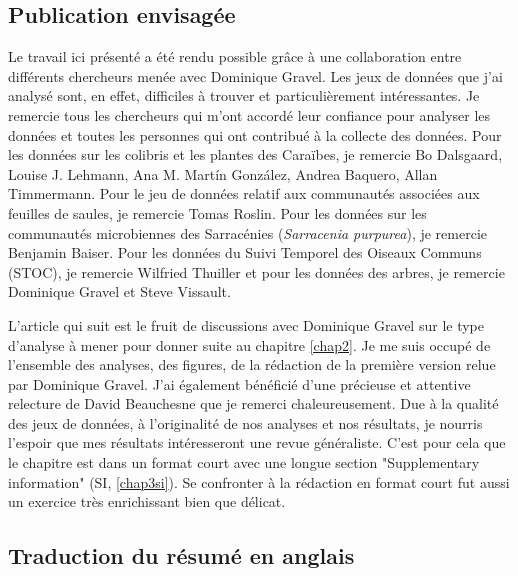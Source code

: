 \subsection{Publication envisagée}

Le travail ici présenté a été rendu possible grâce à une collaboration entre différents
chercheurs menée avec Dominique Gravel. Les jeux de données que j'ai analysé
sont, en effet, difficiles à trouver et particulièrement intéressantes.
Je remercie tous les chercheurs qui m'ont accordé leur confiance
pour analyser les données et toutes les personnes qui ont contribué à la collecte
des données. Pour les données sur les colibris et les plantes des Caraïbes,
je remercie Bo Dalsgaard, Louise J. Lehmann, Ana M. Martín González,
Andrea Baquero, Allan Timmermann. Pour le jeu de données relatif aux communautés
associées aux feuilles de saules, je remercie Tomas Roslin. Pour les données
sur les communautés microbiennes des Sarracénies (\emph{Sarracenia purpurea}),
je remercie Benjamin Baiser. Pour les données du Suivi Temporel des Oiseaux
Communs (STOC), je remercie Wilfried Thuiller et pour les données des arbres,
je remercie Dominique Gravel et Steve Vissault.

L'article qui suit est le fruit de discussions avec Dominique Gravel sur le type
d'analyse à mener pour donner suite au chapitre \ref{chap2}. Je me suis occupé
de l'ensemble des analyses, des figures, de la rédaction de la première version
relue par Dominique Gravel. J'ai également bénéficié d'une précieuse et
attentive relecture de David Beauchesne que je remerci chaleureusement.
Due à la qualité des jeux de données, à l'originalité de nos analyses et
nos résultats, je nourris l'espoir que mes résultats intéresseront
une revue généraliste. C'est pour cela que le chapitre est dans un format court avec une
longue section "Supplementary information" (SI, \ref{chap3si}). Se confronter
à la rédaction en format court fut aussi un exercice très enrichissant bien que délicat.




\subsection{Traduction du résumé en anglais}

